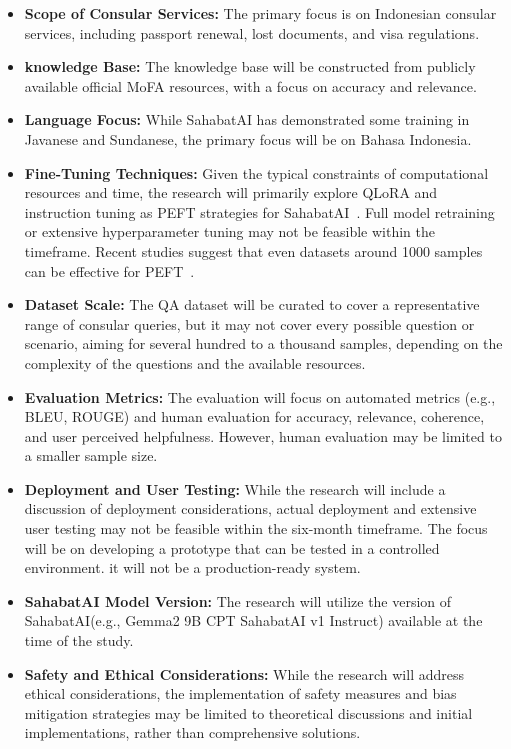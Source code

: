 \documentclass[12pt]{report}
\begin{document}
\begin{itemize}
    \item \textbf{Scope of Consular Services:} The primary focus is on Indonesian consular services, including passport renewal, lost documents, and visa regulations.
    \item \textbf{knowledge Base:} The knowledge base will be constructed from publicly available official MoFA resources, with a focus on accuracy and relevance.
    \item \textbf{Language Focus:} While SahabatAI has demonstrated some training in Javanese and Sundanese, the primary focus will be on Bahasa Indonesia.
    \item \textbf{Fine-Tuning Techniques:} Given the typical constraints of computational resources and time, the research will primarily explore QLoRA and instruction tuning as PEFT strategies for SahabatAI~\cite{gemma_qlora_2025}. Full model retraining or extensive hyperparameter tuning may not be feasible within the timeframe. Recent studies suggest that even datasets around 1000 samples can be effective for PEFT~\cite{ratnakar2025qapairsassessingparameterefficient}.
    \item \textbf{Dataset Scale:} The QA dataset will be curated to cover a representative range of consular queries, but it may not cover every possible question or scenario, aiming for several hundred to a thousand samples, depending on the complexity of the questions and the available resources.
    \item \textbf{Evaluation Metrics:} The evaluation will focus on automated metrics (e.g., BLEU, ROUGE) and human evaluation for accuracy, relevance, coherence, and user perceived helpfulness. However, human evaluation may be limited to a smaller sample size.
    \item \textbf{Deployment and User Testing:} While the research will include a discussion of deployment considerations, actual deployment and extensive user testing may not be feasible within the six-month timeframe. The focus will be on developing a prototype that can be tested in a controlled environment. it will not be a production-ready system.
    \item \textbf{SahabatAI Model Version:} The research will utilize the version of SahabatAI(e.g., Gemma2 9B CPT SahabatAI v1 Instruct) available at the time of the study.
    \item \textbf{Safety and Ethical Considerations:} While the research will address ethical considerations, the implementation of safety measures and bias mitigation strategies may be limited to theoretical discussions and initial implementations, rather than comprehensive solutions.
\end{itemize}
\end{document}
